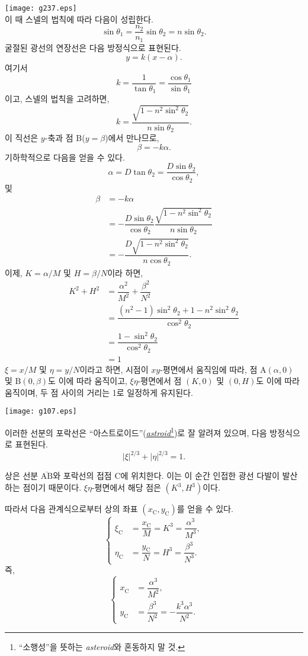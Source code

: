 \documentclass[twocolumn]{article}
\begin{document}
	\texttt{[image: g237.eps]}\\
	이 때 스넬의 법칙에 따라 다음이 성립한다.
	$$ \sin\theta_1 = \frac{n_2}{n_1} \sin\theta_2 = n\sin\theta_2.$$
	굴절된 광선의 연장선은 다음 방정식으로 표현된다.
	$$y=k(x-\alpha).$$
	여기서 
	$$k=\dfrac{1}{\tan\theta_1}=\dfrac{\cos\theta_1}{\sin\theta_1}$$
	이고, 스넬의 법칙을 고려하면,
	$$k=\dfrac{\sqrt{1-n^2\sin^2\theta_2}}{n\sin\theta_2}.$$
	이 직선은 $y$-축과 점 B($y=\beta$)에서 만나므로,
	$$\beta = -k\alpha.$$
	기하학적으로 다음을 얻을 수 있다.
	$$\alpha = D\tan\theta_2 = \dfrac{D\sin\theta_2}{\cos\theta_2},$$
	및
	$$\begin{aligned}
		\beta &= -k\alpha \\
		&= -\dfrac{D\sin\theta_2}{\cos\theta_2}
		\dfrac{\sqrt{1-n^2\sin^2\theta_2}}{n\sin\theta_2}\\
		&=-\dfrac{D\sqrt{1-n^2\sin^2\theta_2}}{n\cos\theta_2}.
	\end{aligned}$$
	이제, $K=\alpha/M$ 및 $H=\beta/N$이라 하면,
	$$ \begin{aligned}
		K^2 + H^2 &= \dfrac{\alpha^2}{M^2}+\dfrac{\beta^2}{N^2}\\
		&=\dfrac{\left(n^2-1\right)\sin^2\theta_2 + 1-n^2\sin^2\theta_2}
		{\cos^2\theta_2}\\
		&=\dfrac{1-\sin^2\theta_2}{\cos^2\theta_2}\\
		&=1
	\end{aligned}$$
	$\xi=x/M$ 및 $\eta=y/N$이라고 하면, 시점이 $xy$-평면에서 움직임에 따라,
	점 $\mathrm{A}(\alpha, 0)$ 및 $\mathrm{B}(0, \beta)$도 이에 따라 움직이고, 
	$\xi\eta$-평면에서 점 $(K, 0)$ 및 $(0, H)$도 이에 따라 움직이며, 
	두 점 사이의 거리는 1로 일정하게 유지된다.
	
	\texttt{[image: g107.eps]}
	
	이러한 선분의 포락선은 ``아스트로이드''(\href{https://en.wikipedia.org/wiki/Astroid}{\emph{astroid}}\footnote{
		``소행성''을 뜻하는 \emph{asteroid}와 혼동하지 말 것.})로 잘 알려져 있으며, 
	다음 방정식으로 표현된다.
	$$ \left| \xi \right|^{2/3} + \left| \eta \right|^{2/3} = 1. $$
	
	상은 선분 $\overline{\mathrm{AB}}$와 포락선의 접점 $\mathrm{C}$에 위치한다. 
	이는 이 순간 인접한 광선 다발이 발산하는 점이기 때문이다. 
	$\xi\eta$-평면에서 해당 점은 $(K^3, H^3)$이다.
	
	따라서 다음 관계식으로부터 상의 좌표 $(x_{\mathrm{C}}^{}, y_{\mathrm{C}}^{})$를 얻을 수 있다.
	$$ \left\{ 
	\begin{aligned}
		\xi_{\mathrm{C}}^{} &= \dfrac{x_{\mathrm{C}}^{}}{M} = K^3 = \dfrac{\alpha^3}{M^3},\\
		\eta_{\mathrm{C}}^{} &= \dfrac{y_{\mathrm{C}}^{}}{N} = H^3 = \dfrac{\beta^3}{N^3}.
	\end{aligned}
	\right.$$
	즉,
	$$ \left\{ 
	\begin{aligned}
		x_{\mathrm{C}}^{} &= \dfrac{\alpha^3}{M^2},\\
		y_{\mathrm{C}}^{} &= \dfrac{\beta^3}{N^2}=-\dfrac{k^3\alpha^3}{N^2}.
	\end{aligned}
	\right.$$
	
\end{document}
